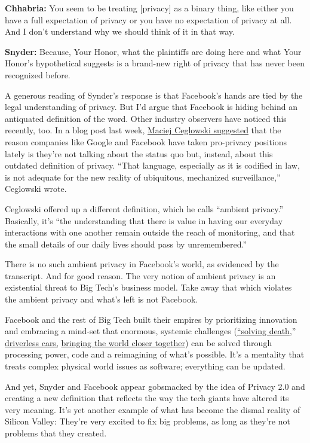 \textbf{Chhabria:} You seem to be treating {[}privacy{]} as a binary
thing, like either you have a full expectation of privacy or you have no
expectation of privacy at all. And I don't understand why we should
think of it in that way.

\textbf{Snyder:} Because, Your Honor, what the plaintiffs are doing here
and what Your Honor's hypothetical suggests is a brand-new right of
privacy that has never been recognized before.

A generous reading of Synder's response is that Facebook's hands are
tied by the legal understanding of privacy. But I'd argue that Facebook
is hiding behind an antiquated definition of the word. Other industry
observers have noticed this recently, too. In a blog post last week,
\href{https://idlewords.com/2019/06/the_new_wilderness.htm}{Maciej
Ceglowski suggested} that the reason companies like Google and Facebook
have taken pro-privacy positions lately is they're not talking about the
status quo but, instead, about this outdated definition of privacy.
``That language, especially as it is codified in law, is not adequate
for the new reality of ubiquitous, mechanized surveillance,'' Ceglowski
wrote.

Ceglowski offered up a different definition, which he calls ``ambient
privacy.'' Basically, it's ``the understanding that there is value in
having our everyday interactions with one another remain outside the
reach of monitoring, and that the small details of our daily lives
should pass by unremembered.''

There is no such ambient privacy in Facebook's world, as evidenced by
the transcript. And for good reason. The very notion of ambient privacy
is an existential threat to Big Tech's business model. Take away that
which violates the ambient privacy and what's left is not Facebook.

Facebook and the rest of Big Tech built their empires by prioritizing
innovation and embracing a mind-set that enormous, systemic challenges
(\href{https://content.time.com/time/subscriber/article/0,33009,2152422,00.html}{``solving
death},'' \href{https://waymo.com/}{driverless cars,}
\href{https://techcrunch.com/2017/06/22/bring-the-world-closer-together/}{bringing
the world closer together}) can be solved through processing power, code
and a reimagining of what's possible. It's a mentality that treats
complex physical world issues as software; everything can be updated.

And yet, Snyder and Facebook appear gobsmacked by the idea of Privacy
2.0 and creating a new definition that reflects the way the tech giants
have altered its very meaning. It's yet another example of what has
become the dismal reality of Silicon Valley: They're very excited to fix
big problems, as long as they're not problems that they created.

